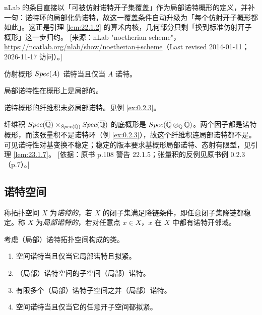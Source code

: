 \begin{yizhu}
nLab 的条目直接以「可被仿射诺特开子集覆盖」作为局部诺特概形的定义，并补一句：诺特环的局部化仍诺特，故这一覆盖条件自动升级为「每个仿射开子概形都如此」。这正是引理 \ref{lem:22.1.2} 的算术内核，几何部分只剩「换到标准仿射开子概形」这一步归约。
[来源：nLab "noetherian scheme"，\url{https://ncatlab.org/nlab/show/noetherian+scheme}（Last revised 2014-01-11；2026-11-17 访问）。]
\end{yizhu}

\begin{corollary}\label{cor:22.1.3}
仿射概形 $Spec(A)$ 诺特当且仅当 $A$ 诺特。
\end{corollary}

\begin{corollary}\label{cor:22.1.4}
局部诺特性在概形上是局部的。
\end{corollary}

\begin{warning}\label{warn:22.1.5}
诺特概形的纤维积未必局部诺特。见例 \ref{ex:0.2.3}。
\end{warning}

\begin{yizhu}
纤维积 $Spec(\overline{\mathbb{Q}}) \times_{Spec(\mathbb{Q})} Spec(\overline{\mathbb{Q}})$ 的底概形是 $Spec(\overline{\mathbb{Q}} \otimes_{\mathbb{Q}} \overline{\mathbb{Q}})$。两个因子都是诺特概形，而该张量积不是诺特环（例 \ref{ex:0.2.3}），故这个纤维积连局部诺特都不是。可见诺特性对基变换不稳定；稳定的版本要求基概形局部诺特、态射有限型，见引理 \ref{lem:23.1.7}。
[依据：原书 p.108 警告 22.1.5；张量积的反例见原书例 0.2.3（p.7）。]
\end{yizhu}

\subsection{诺特空间}\label{sec:22.2}

\begin{definition}\label{def:22.2.1}
称拓扑空间 $X$ 为\emph{诺特的}，若 $X$ 的闭子集满足降链条件，即任意闭子集降链都稳定。称 $X$ 为\emph{局部诺特的}，若对任意点 $x \in X$，$x$ 在 $X$ 中都有诺特开邻域。
\end{definition}

\begin{exercise}\label{exc:22.2.2}
考虑（局部）诺特拓扑空间构成的类。
\begin{enumerate}[label=(\roman*),leftmargin=2em,itemsep=0.25ex]
  \item 空间诺特当且仅当它局部诺特且拟紧。
  \item （局部）诺特空间的子空间（局部）诺特。
  \item 有限多个（局部）诺特子空间之并（局部）诺特。
  \item 空间诺特当且仅当它的任意开子空间都拟紧。
\end{enumerate}
\end{exercise}

